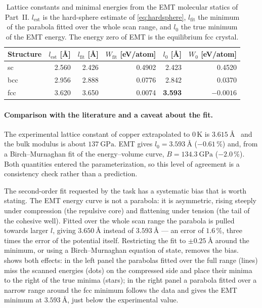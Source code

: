 \documentclass[11pt,a4paper]{article}
\numberwithin{equation}{section}
\theoremstyle{remark}
\begin{document}
\begin{table}[ht]
  \centering
  \caption{Lattice constants and minimal energies from the EMT molecular statics of Part~II.
    $l_{\mathrm{est}}$ is the hard-sphere estimate of \cref{eq:hardsphere}, $l_{\mathrm{fit}}$ the
    minimum of the parabola fitted over the whole scan range, and $l_0$ the true minimum of the EMT
    energy. The energy zero of EMT is the equilibrium fcc crystal.}
  \label{tab:lattice}
  \begin{tabular}{lrrrrr}
    \toprule
    Structure & $l_{\mathrm{est}}$ [\AA] & $l_{\mathrm{fit}}$ [\AA] & $W_{\mathrm{fit}}$ [eV/atom]
      & $l_0$ [\AA] & $W_0$ [eV/atom] \\
    \midrule
    sc  & 2.560 & 2.426 & 0.4902 & 2.423 & 0.4520 \\
    bcc & 2.956 & 2.888 & 0.0776 & 2.842 & 0.0370 \\
    fcc & 3.620 & 3.650 & 0.0074 & \textbf{3.593} & \textbf{$-0.0016$} \\
    \bottomrule
  \end{tabular}
\end{table}

\paragraph{Comparison with the literature and a caveat about the fit.}
The experimental lattice constant of copper extrapolated to 0\,K is
$\SI{3.615}{\angstrom}$~\citep{straumanis1969} and the bulk modulus is about
$\SI{137}{\giga\pascal}$. EMT gives $l_0 = \SI{3.593}{\angstrom}$ ($-0.61\,\%$) and, from a
Birch--Murnaghan fit of the energy--volume curve, $B = \SI{134.3}{\giga\pascal}$ ($-2.0\,\%$). Both
quantities entered the parameterization, so this level of agreement is a consistency check rather than
a prediction.

The second-order fit requested by the task has a systematic bias that is worth stating. The EMT energy
curve is not a parabola: it is asymmetric, rising steeply under compression (the repulsive core) and
flattening under tension (the tail of the cohesive well). Fitted over the whole scan range the
parabola is pulled towards larger $l$, giving $\SI{3.650}{\angstrom}$ instead of
$\SI{3.593}{\angstrom}$ --- an error of $1.6\,\%$, three times the error of the potential itself.
Restricting the fit to $\pm\SI{0.25}{\angstrom}$ around the minimum, or using a Birch--Murnaghan
equation of state, removes the bias.  shows both effects: in the left panel the
parabolas fitted over the full range (lines) miss the scanned energies (dots) on the compressed side and
place their minima to the right of the true minima (stars); in the right panel a parabola fitted over a
narrow range around the fcc minimum follows the data and gives the EMT minimum at
$\SI{3.593}{\angstrom}$, just below the experimental value.
\end{document}
